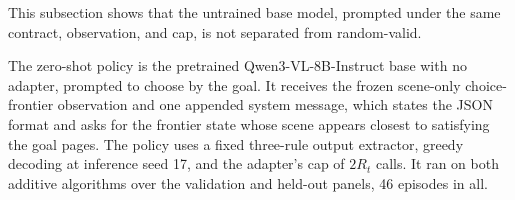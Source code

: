 This subsection shows that the untrained base model, prompted under the same contract, observation, and cap, is not separated from random-valid.

The zero-shot policy is the pretrained Qwen3-VL-8B-Instruct base with no adapter, prompted to choose by the goal. It receives the frozen scene-only choice-frontier observation and one appended system message, which states the JSON format and asks for the frontier state whose scene appears closest to satisfying the goal pages. The policy uses a fixed three-rule output extractor, greedy decoding at inference seed 17, and the adapter's cap of $2R_t$ calls. It ran on both additive algorithms over the validation and held-out panels, 46 episodes in all.


